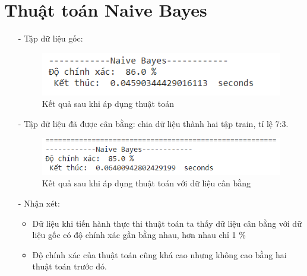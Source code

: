 \documentclass{report}
\begin{document}
\section{Thuật toán Naive Bayes}
     \fontsize{13}{14}\selectfont
     \begin{enumerate}
    \item [- ]	Tập dữ liệu gốc:
         \begin{center}
        \begin{figure}[htp]
    	\begin{center}
    		\includegraphics[scale =1]{images/nb_o.PNG}
    	\end{center}
    		\caption{Kết quả sau khi áp dụng thuật toán}
    \end{figure}
        \end{center} 
    \item [- ]	Tập dữ liệu đã được cân bằng: chia dữ liệu thành hai tập train, tỉ lệ 7:3.
         \begin{center}
        \begin{figure}[htp]
    	\begin{center}
    		\includegraphics[scale =1]{images/nb_smo.PNG}
    	\end{center}
    		\caption{Kết quả sau khi áp dụng thuật toán với dữ liệu cân bằng}
    \end{figure}
        \end{center}
\item [- ]	Nhận xét:
     \begin{itemize}
            \item Dữ liệu khi tiến hành thực thi thuật toán ta thấy dữ liệu cân bằng với dữ liệu gốc có độ chính xác gần bằng nhau, hơn nhau chỉ 1 \%
            \item Độ chính xác của thuật toán cũng khá cao nhưng không cao bằng hai thuật toán trước đó.
    \end{itemize}
    \end{enumerate}
    
\end{document}
